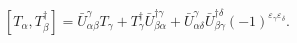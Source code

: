 \begin{equation}\label{5.11}
[T_\alpha,T^\dagger_\beta]=\bar{U}^\gamma_{\alpha\beta}T_\gamma+
T^\dagger_\gamma\bar{U}^{\dagger\gamma}_{\beta\alpha}+
\bar{U}^\gamma_{\alpha\delta}\bar{U}^{\dagger\delta}_{\beta\gamma}
(-1)^{\varepsilon_\gamma\varepsilon_\delta}.
\end{equation}

